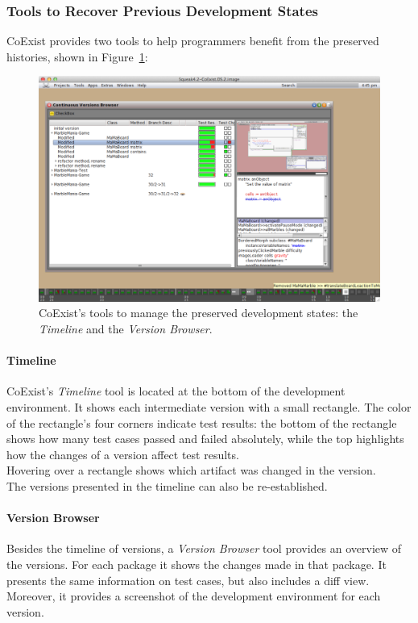 \subsubsection{Tools to Recover Previous Development States}

CoExist provides two tools to help programmers benefit from the preserved histories, shown in Figure~\ref{fig:CoExist}:

\begin{figure}[h]
    \centering
    \includegraphics[width=\textwidth]{figures/2_background/4_coexistTools.pdf}
    \caption{CoExist's tools to manage the preserved development states: the \emph{Timeline} and the \emph{Version Browser}.}
    \label{fig:CoExist}
\end{figure}

\paragraph{Timeline}
CoExist's \emph{Timeline} tool is located at the bottom of the development environment.
It shows each intermediate version with a small rectangle.
The color of the rectangle's four corners indicate test results: the bottom of the rectangle shows how many test cases passed and failed absolutely, while the top highlights how the changes of a version affect test results.\\
Hovering over a rectangle shows which artifact was changed in the version.\\
The versions presented in the timeline can also be re-established.

\paragraph{Version Browser}
Besides the timeline of versions, a \emph{Version Browser} tool provides an overview of the versions.
For each package it shows the changes made in that package.
It presents the same information on test cases, but also includes a diff view.
Moreover, it provides a screenshot of the development environment for each version.


